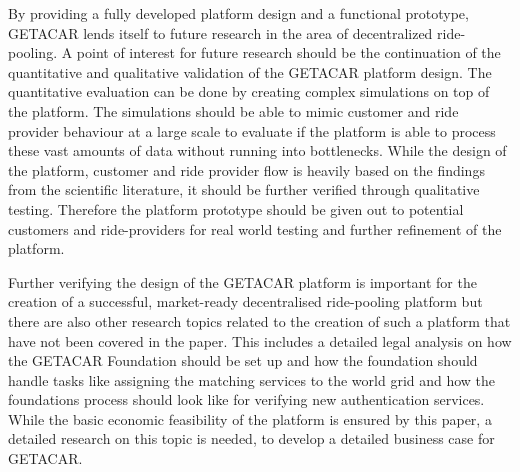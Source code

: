 By providing a fully developed platform design and a functional prototype, GETACAR lends itself to future research in the area of decentralized ride-pooling.
A point of interest for future research should be the continuation of the quantitative and qualitative validation of the GETACAR platform design. The quantitative evaluation can be done by creating complex simulations on top of the platform. The simulations should be able to mimic customer and ride provider behaviour at a large scale to evaluate if the platform is able to process these vast amounts of data without running into bottlenecks. While the design of the platform, customer and ride provider flow is heavily based on the findings from the scientific literature, it should be further verified through qualitative testing. Therefore the platform prototype should be given out to potential customers and ride-providers for real world testing and further refinement of the platform.

Further verifying the design of the GETACAR platform is important for the creation of a successful, market-ready decentralised ride-pooling platform but there are also other research topics related to the creation of such a platform that have not been covered in the paper. This includes a detailed legal analysis on how the GETACAR Foundation should be set up and how the foundation should handle tasks like assigning the matching services to the world grid and how the foundations process should look like for verifying new authentication services.
While the basic economic feasibility of the platform is ensured by this paper, a detailed research on this topic is needed, to develop a detailed business case for GETACAR.